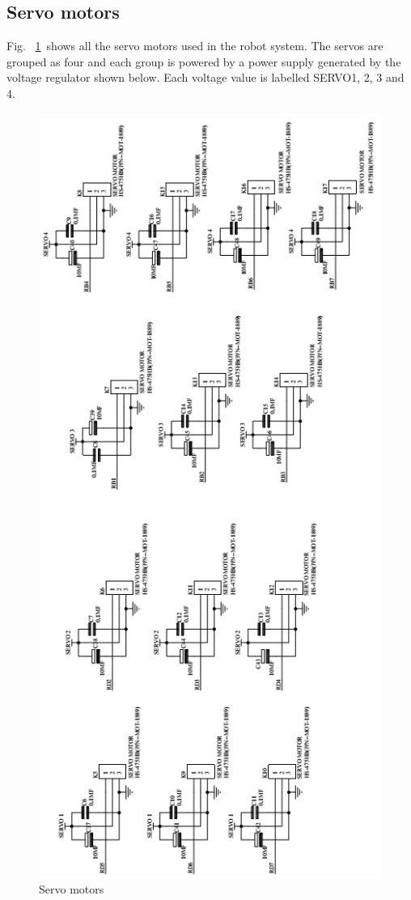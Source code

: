 \documentclass{report}
\begin{document}
\subsection{Servo motors}
Fig. ~\ref{fig213}\ shows all the servo motors used in the robot system. The servos are grouped as four and each group is powered by a power supply generated by the voltage regulator shown below. Each voltage value is labelled SERVO1, 2, 3 and 4.\\
\begin{figure}[h!]
\centering
\includegraphics[scale=0.73]{circservo}
\caption{Servo motors}
\label{fig213}
\end{figure}
\FloatBarrier
\end{document}
